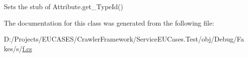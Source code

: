 Sets the stub of Attribute.\-get\-\_\-\-Type\-Id()



The documentation for this class was generated from the following file\-:\begin{DoxyCompactItemize}
\item 
D\-:/\-Projects/\-E\-U\-C\-A\-S\-E\-S/\-Crawler\-Framework/\-Service\-E\-U\-Cases.\-Test/obj/\-Debug/\-Fakes/s/\hyperlink{s_2f_8cs}{f.\-cs}\end{DoxyCompactItemize}
